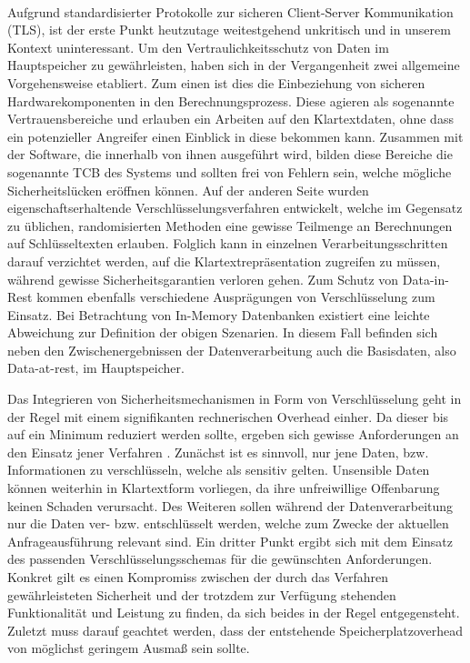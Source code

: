 \paragraph{}
Aufgrund standardisierter Protokolle zur sicheren Client-Server Kommunikation (\ac{TLS}), ist der erste Punkt heutzutage weitestgehend unkritisch und in unserem Kontext uninteressant. Um den Vertraulichkeitsschutz von Daten im Hauptspeicher zu gewährleisten, haben sich in der Vergangenheit zwei allgemeine Vorgehensweise etabliert. Zum einen ist dies die Einbeziehung von sicheren Hardwarekomponenten in den Berechnungsprozess. Diese agieren als sogenannte Vertrauensbereiche und erlauben ein Arbeiten auf den Klartextdaten, ohne dass ein potenzieller Angreifer einen Einblick in diese bekommen kann. Zusammen mit der Software, die innerhalb von ihnen ausgeführt wird, bilden diese Bereiche die sogenannte \ac{TCB} des Systems und sollten frei von Fehlern sein, welche mögliche Sicherheitslücken eröffnen können. Auf der anderen Seite wurden eigenschaftserhaltende Verschlüsselungsverfahren entwickelt, welche im Gegensatz zu üblichen, randomisierten Methoden eine gewisse Teilmenge an Berechnungen auf Schlüsseltexten erlauben. Folglich kann in einzelnen Verarbeitungsschritten darauf verzichtet werden, auf die Klartextrepräsentation zugreifen zu müssen, während gewisse Sicherheitsgarantien verloren gehen. Zum Schutz von Data-in-Rest kommen ebenfalls verschiedene Ausprägungen von Verschlüsselung zum Einsatz. Bei Betrachtung von In-Memory Datenbanken existiert eine leichte Abweichung zur Definition der obigen Szenarien. In diesem Fall befinden sich neben den Zwischenergebnissen der Datenverarbeitung auch die Basisdaten, also Data-at-rest, im Hauptspeicher.

Das Integrieren von Sicherheitsmechanismen in Form von Verschlüsselung geht in der Regel mit einem signifikanten rechnerischen Overhead einher. Da dieser bis auf ein Minimum reduziert werden sollte, ergeben sich gewisse Anforderungen an den Einsatz jener Verfahren \cite{Shmueli2010}. Zunächst ist es sinnvoll, nur jene Daten, bzw. Informationen zu verschlüsseln, welche als sensitiv gelten. Unsensible Daten können weiterhin in Klartextform vorliegen, da ihre unfreiwillige Offenbarung keinen Schaden verursacht. Des Weiteren sollen während  der Datenverarbeitung nur die Daten ver- bzw. entschlüsselt werden, welche zum Zwecke der aktuellen Anfrageausführung relevant sind. Ein dritter Punkt ergibt sich mit dem Einsatz des passenden Verschlüsselungsschemas für die gewünschten Anforderungen. Konkret gilt es einen Kompromiss zwischen der durch das Verfahren gewährleisteten Sicherheit und der trotzdem zur Verfügung stehenden Funktionalität und Leistung zu finden, da sich beides in der Regel entgegensteht. Zuletzt muss darauf geachtet werden, dass der entstehende Speicherplatzoverhead von möglichst geringem Ausmaß sein sollte.

